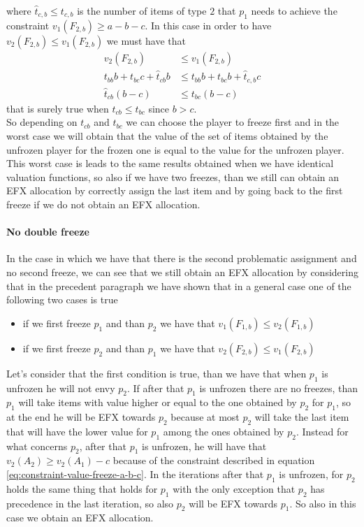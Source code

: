 where $ \hat t_{c,b}\le t_{c,b}$ is the number of items of type $2$ that $p_1$ needs to achieve the constraint $v_1(F_{2,b})\ge a-b-c$. In this case in order to have $v_2(F_{2,b}) \le v_1(F_{2,b})$ we must have that
\begin{align*}
    v_2(F_{2,b}) &\le v_1(F_{2,b})\\
    t_{bb}b + t_{bc}c +  \hat t_{cb} b &\le t_{bb}b + t_{bc}b +  \hat t_{c,b} c\\
    \hat t_{cb}(b-c) &\le t_{bc}(b-c)
\end{align*}
that is surely true when $t_{cb}\le t_{bc}$ since $b> c$.\\
So depending on $t_{cb}$ and $t_{bc}$ we can choose the player to freeze first and in the worst case we will obtain that the value of the set of items obtained by the unfrozen player for the frozen one is equal to the value for the unfrozen player.
This worst case is leads to the same results obtained when we have identical valuation functions, so also if we have two freezes, than we still can obtain an EFX allocation by correctly assign the last item and by going back to the first freeze if we do not obtain an EFX allocation.


\paragraph{No double freeze} In the case in which we have that there is the second problematic assignment and no second freeze, we can see that we still obtain an EFX allocation by considering that in the precedent paragraph we have shown that in a general case one of the following two cases is true
\begin{itemize}
    \item if we first freeze $p_1$ and than $p_2$ we have that $v_1(F_{1,b})\le v_2(F_{1,b})$
    \item if we first freeze $p_2$ and than $p_1$ we have that $v_2(F_{2,b})\le v_1(F_{2,b})$
\end{itemize}
Let's consider that the first condition is true, than we have that when $p_1$ is unfrozen he will not envy $p_2$. If after that $p_1$ is unfrozen there are no freezes, than $p_1$ will take items with value higher or equal to the one obtained by $p_2$ for $p_1$, so at the end he will be EFX towards $p_2$ because at most $p_2$ will take the last item that will have the lower value for $p_1$ among the ones obtained by $p_2$. Instead for what concerns $p_2$, after that $p_1$ is unfrozen, he will have that $v_2(A_2) \ge v_2(A_1) - c$ because of the constraint described in equation \ref{eq:constraint-value-freeze-a-b-c}. In the iterations after that $p_1$ is unfrozen, for $p_2$ holds the same thing that holds for $p_1$ with the only exception that $p_2$ has precedence in the last iteration, so also $p_2$ will be EFX towards $p_1$. So also in this case we obtain an EFX allocation.

